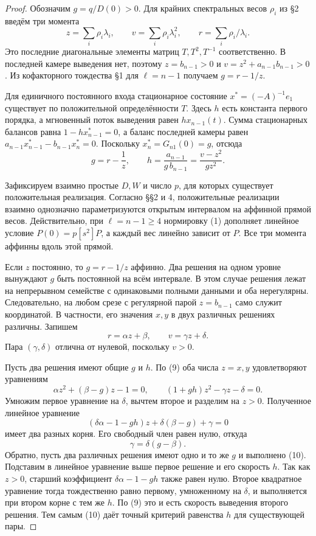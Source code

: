 \documentclass[11pt,a4paper]{article}
\begin{document}
\begin{proof}
Обозначим \(g=q/D(0)>0\). Для крайних спектральных весов \(\rho_i\) из §2 введём три момента
\[
 z=\sum_i\rho_i\lambda_i,\qquad
 v=\sum_i\rho_i\lambda_i^2,\qquad
 r=\sum_i\rho_i/\lambda_i .
\]
Это последние диагональные элементы матриц \(T,T^2,T^{-1}\) соответственно. В последней камере выведения нет, поэтому
\(z=b_{n-1}>0\) и \(v=z^2+a_{n-1}b_{n-1}>0\).
Из кофакторного тождества §1 для \(\ell=n-1\) получаем \(g=r-1/z\).

Для единичного постоянного входа стационарное состояние \(x^*=(-A)^{-1}e_1\) существует по положительной определённости \(T\). Здесь \(h\) есть константа первого порядка, а мгновенный поток выведения равен \(h x_{n-1}(t)\). Сумма стационарных балансов равна \(1-hx^*_{n-1}=0\), а баланс последней камеры равен \(a_{n-1}x^*_{n-1}-b_{n-1}x^*_n=0\). Поскольку \(x^*_n=G_{n1}(0)=g\), отсюда
\[
 g=r-\frac1z,\qquad
 h=\frac{a_{n-1}}{g\,b_{n-1}}=\frac{v-z^2}{g z^2}.
 \tag{9}
\]

Зафиксируем взаимно простые \(D,W\) и число \(p\), для которых существует положительная реализация. Согласно §§2 и 4, положительные реализации взаимно однозначно параметризуются открытым интервалом на аффинной прямой весов. Действительно, при \(\ell=n-1\ge4\) нормировку (1) дополняет линейное условие \(P(0)=p[s^2]P\), а каждый вес линейно зависит от \(P\). Все три момента аффинны вдоль этой прямой.

Если \(z\) постоянно, то \(g=r-1/z\) аффинно. Два решения на одном уровне вынуждают \(g\) быть постоянной на всём интервале. В этом случае решения лежат на непрерывном семействе с одинаковыми полными данными и оба нерегулярны. Следовательно, на любом срезе с регулярной парой \(z=b_{n-1}\) само служит координатой. В частности, его значения \(x,y\) в двух различных решениях различны. Запишем
\[
 r=\alpha z+\beta,\qquad v=\gamma z+\delta .
\]
Пара \((\gamma,\delta)\) отлична от нулевой, поскольку \(v>0\).

Пусть два решения имеют общие \(g\) и \(h\). По (9) оба числа \(z=x,y\) удовлетворяют уравнениям
\[
 \alpha z^2+(\beta-g)z-1=0,\qquad
 (1+gh)z^2-\gamma z-\delta=0 .
\]
Умножим первое уравнение на \(\delta\), вычтем второе и разделим на \(z>0\). Полученное линейное уравнение
\[
 (\delta\alpha-1-gh)z+\delta(\beta-g)+\gamma=0
\]
имеет два разных корня. Его свободный член равен нулю, откуда
\[
 \gamma=\delta(g-\beta).
 \tag{10}
\]
Обратно, пусть два различных решения имеют одно и то же \(g\) и выполнено (10). Подставим в линейное уравнение выше первое решение и его скорость \(h\). Так как \(z>0\), старший коэффициент \(\delta\alpha-1-gh\) также равен нулю. Второе квадратное уравнение тогда тождественно равно первому, умноженному на \(\delta\), и выполняется при втором корне с тем же \(h\). По (9) это и есть скорость выведения второго решения. Тем самым (10) даёт точный критерий равенства \(h\) для существующей пары.


\end{proof}
\end{document}
